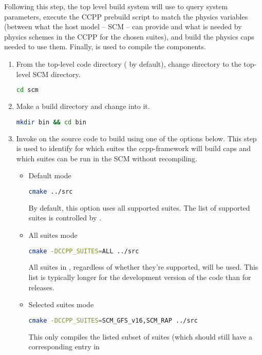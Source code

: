Following this step, the top level build system will use  to query system parameters, execute the CCPP prebuild script to match the physics variables (between what the host model -- SCM -- can provide and what is needed by physics schemes in the CCPP for the chosen suites), and build the physics caps needed to use them. Finally,  is used to compile the components.
\begin{enumerate}
 \item From the top-level code directory ( by default), change directory to the top-level SCM directory.
\begin{lstlisting}[language=bash]
cd scm
\end{lstlisting}
\item Make a build directory and change into it.
\begin{lstlisting}[language=bash]
mkdir bin && cd bin
\end{lstlisting}
\item Invoke  on the source code to build using one of the options below. This step is used to identify for which suites the ccpp-framework will build caps and which suites can be run in the SCM without recompiling.
\begin{itemize}
\item Default mode
\begin{lstlisting}[language=bash]
cmake ../src
\end{lstlisting}
By default, this option uses all supported suites. The list of supported suites is controlled by .
\item All suites mode
\begin{lstlisting}[language=bash]
cmake -DCCPP_SUITES=ALL ../src
\end{lstlisting}
All suites in , regardless of whether they're supported, will be used. This list is typically longer for the development version of the code than for releases.
\item Selected suites mode
\begin{lstlisting}[language=bash]
cmake -DCCPP_SUITES=SCM_GFS_v16,SCM_RAP ../src
\end{lstlisting}
This only compiles the listed subset of suites (which should still have a corresponding entry in 



\end{itemize}
\end{enumerate}
